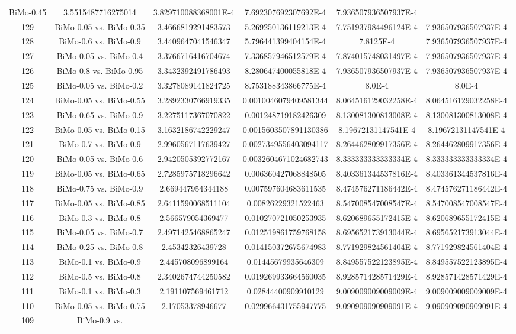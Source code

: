 \documentclass[a4paper,10pt]{article}
\begin{document}
\begin{landscape}
\begin{table}[!htp]
\begin{tabular}{cccccc}
BiMo-0.45&3.5515487716275014&3.829710088368001E-4&7.692307692307692E-4&7.936507936507937E-4\\129&BiMo-0.05 vs. BiMo-0.35&3.4666819291483573&5.269250136119213E-4&7.751937984496124E-4&7.936507936507937E-4\\128&BiMo-0.6 vs. BiMo-0.9&3.4409647041546347&5.796441399404154E-4&7.8125E-4&7.936507936507937E-4\\127&BiMo-0.05 vs. BiMo-0.4&3.3766716416704674&7.336857946512579E-4&7.874015748031497E-4&7.936507936507937E-4\\126&BiMo-0.8 vs. BiMo-0.95&3.3432392491786493&8.280647400055818E-4&7.936507936507937E-4&7.936507936507937E-4\\125&BiMo-0.05 vs. BiMo-0.2&3.3278089141824725&8.753188343866775E-4&8.0E-4&8.0E-4\\124&BiMo-0.05 vs. BiMo-0.55&3.2892330766919335&0.0010046079409581344&8.064516129032258E-4&8.064516129032258E-4\\123&BiMo-0.65 vs. BiMo-0.9&3.2275117367070822&0.001248719182426309&8.130081300813008E-4&8.130081300813008E-4\\122&BiMo-0.05 vs. BiMo-0.15&3.1632186742229247&0.0015603507891130386&8.19672131147541E-4&8.19672131147541E-4\\121&BiMo-0.7 vs. BiMo-0.9&2.9960567117639427&0.0027349556403094117&8.264462809917356E-4&8.264462809917356E-4\\120&BiMo-0.05 vs. BiMo-0.6&2.9420505392772167&0.0032604671024682743&8.333333333333334E-4&8.333333333333334E-4\\119&BiMo-0.05 vs. BiMo-0.65&2.7285975718296642&0.006360427068848505&8.403361344537816E-4&8.403361344537816E-4\\118&BiMo-0.75 vs. BiMo-0.9&2.669447954344188&0.007597604683611535&8.474576271186442E-4&8.474576271186442E-4\\117&BiMo-0.05 vs. BiMo-0.85&2.6411590068511104&0.00826229321522463&8.547008547008547E-4&8.547008547008547E-4\\116&BiMo-0.3 vs. BiMo-0.8&2.566579054369477&0.010270721050253935&8.620689655172415E-4&8.620689655172415E-4\\115&BiMo-0.05 vs. BiMo-0.7&2.4971425468865247&0.012519861759768158&8.695652173913044E-4&8.695652173913044E-4\\114&BiMo-0.25 vs. BiMo-0.8&2.45342326439728&0.014150372675674983&8.771929824561404E-4&8.771929824561404E-4\\113&BiMo-0.1 vs. BiMo-0.9&2.445708096899164&0.01445679935646309&8.849557522123895E-4&8.849557522123895E-4\\112&BiMo-0.5 vs. BiMo-0.8&2.3402674744250582&0.019269933664560035&8.928571428571429E-4&8.928571428571429E-4\\111&BiMo-0.1 vs. BiMo-0.3&2.191107569461712&0.02844400909910129&9.009009009009009E-4&9.009009009009009E-4\\110&BiMo-0.05 vs. BiMo-0.75&2.17053378946677&0.029966431755947775&9.090909090909091E-4&9.090909090909091E-4\\109&BiMo-0.9 vs. 
\end{tabular}
\end{table}
\end{landscape}
\end{document}
